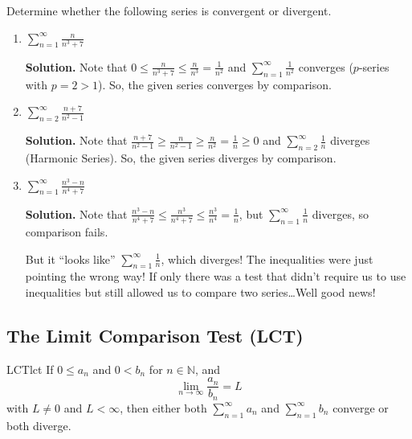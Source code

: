 \begin{Example}{}{}
    Determine whether the following series is convergent or divergent.
    \begin{enumerate}[label=(\roman*)]
        \item $ \displaystyle \sum\limits_{n=1}^{\infty} \frac{n}{n^3+7} $

              \textbf{Solution.}
              Note that
              $ \displaystyle 0\leqslant \frac{n}{n^3+7} \leqslant \frac{n}{n^3}=\frac{1}{n^2} $
              and $ \displaystyle \sum\limits_{n=1}^{\infty} \frac{1}{n^2} $ converges
              ($ p $-series with $ p=2>1 $).
              So, the given series converges by comparison.
        \item $ \displaystyle \sum\limits_{n=2}^{\infty} \frac{n+7}{n^2-1}  $

              \textbf{Solution.}
              Note that
              $ \displaystyle \frac{n+7}{n^2-1} \geqslant \frac{n}{n^2-1} \geqslant \frac{n}{n^2} =\frac{1}{n}
                  \geqslant 0 $
              and $ \displaystyle \sum\limits_{n=2}^{\infty} \frac{1}{n} $ diverges (Harmonic Series).
              So, the given series diverges by comparison.
        \item $ \displaystyle \sum\limits_{n=1}^{\infty} \frac{n^3-n}{n^4+7}  $

              \textbf{Solution.}
              Note that
              $ \displaystyle \frac{n^3-n}{n^4+7} \leqslant \frac{n^3}{n^4+7}\leqslant \frac{n^3}{n^4} =\frac{1}{n} $,
              but $ \displaystyle \sum\limits_{n=1}^{\infty} \frac{1}{n}  $ diverges, so comparison fails.

              But it ``looks like'' $ \displaystyle \sum\limits_{n=1}^{\infty} \frac{1}{n} $, which diverges!
              The inequalities were just pointing the wrong way! If only there was a test that didn't require
              us to use inequalities but still allowed us to compare two series\dots Well good news!
    \end{enumerate}
\end{Example}

\subsection*{The Limit Comparison Test (LCT)}
\begin{Theorem}{LCT}{lct}
    If $ 0\leqslant a_n $ and $ 0<b_n $ for $ n\in\mathbb{N} $, and
    \[ \lim\limits_{{n} \to {\infty}} \frac{a_n}{b_n} =L \]
    with $ L\neq 0 $ and $ L<\infty $, then either both $ \sum\limits_{n=1}^{\infty} a_n $
    and $ \sum\limits_{n=1}^{\infty} b_n $ converge or both diverge.
\end{Theorem}

